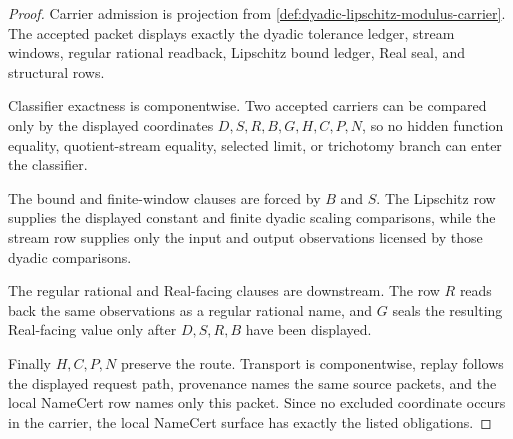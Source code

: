 \begin{proof}
Carrier admission is projection from \autoref{def:dyadic-lipschitz-modulus-carrier}. The accepted packet displays exactly the dyadic tolerance ledger, stream windows, regular rational readback, Lipschitz bound ledger, Real seal, and structural rows.

Classifier exactness is componentwise. Two accepted carriers can be compared only by the displayed coordinates $D,S,R,B,G,H,C,P,N$, so no hidden function equality, quotient-stream equality, selected limit, or trichotomy branch can enter the classifier.

The bound and finite-window clauses are forced by $B$ and $S$. The Lipschitz row supplies the displayed constant and finite dyadic scaling comparisons, while the stream row supplies only the input and output observations licensed by those dyadic comparisons.

The regular rational and Real-facing clauses are downstream. The row $R$ reads back the same observations as a regular rational name, and $G$ seals the resulting Real-facing value only after $D,S,R,B$ have been displayed.

Finally $H,C,P,N$ preserve the route. Transport is componentwise, replay follows the displayed request path, provenance names the same source packets, and the local NameCert row names only this packet. Since no excluded coordinate occurs in the carrier, the local NameCert surface has exactly the listed obligations.
\end{proof}

